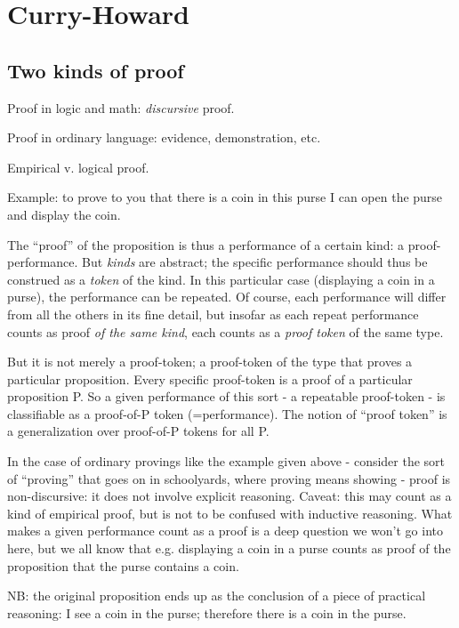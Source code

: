 \chapter{Curry-Howard}
\label{sect:curry-howard}

\section{Two kinds of proof}

Proof in logic and math: \textit{discursive} proof.

Proof in ordinary language: evidence, demonstration, etc.

Empirical v. logical proof.

Example: to prove to you that there is a coin in this purse I can open
the purse and display the coin.

The ``proof'' of the proposition is thus a performance of a certain
kind: a proof-performance.  But \textit{kinds} are abstract; the
specific performance should thus be construed as a \textit{token} of
the kind.  In this particular case (displaying a coin in a purse), the
performance can be repeated.  Of course, each performance will differ
from all the others in its fine detail, but insofar as each repeat
performance counts as proof \textit{of the same kind}, each counts as
a \textit{proof token} of the same type.

But it is not merely a proof-token; a proof-token of the type that
proves a particular proposition.  Every specific proof-token is a
proof of a particular proposition P.  So a given performance of this
sort - a repeatable proof-token - is classifiable as a proof-of-P
token (=performance).  The notion of \enquote{proof token} is a
generalization over proof-of-P tokens for all P.

In the case of ordinary provings like the example given above -
consider the sort of ``proving'' that goes on in schoolyards, where
proving means showing - proof is non-discursive: it does not involve
explicit reasoning.  Caveat: this may count as a kind of empirical
proof, but is not to be confused with inductive reasoning.  What makes
a given performance count as a proof is a deep question we won't go
into here, but we all know that e.g. displaying a coin in a purse
counts as proof of the proposition that the purse contains a coin.

NB: the original proposition ends up as the conclusion of a piece of
practical reasoning: I see a coin in the purse; therefore there is a
coin in the purse.

